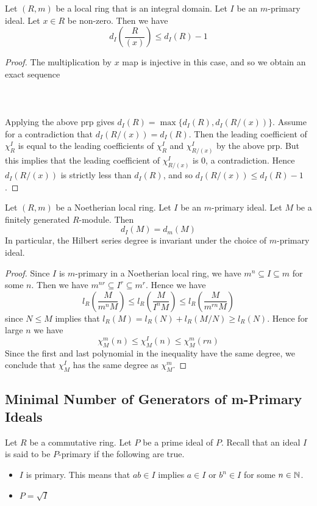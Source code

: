 \documentclass[a4paper]{article}
\begin{document}
\begin{crl}{}{} Let $(R,m)$ be a local ring that is an integral domain. Let $I$ be an $m$-primary ideal. Let $x\in R$ be non-zero. Then we have $$d_I\left(\frac{R}{(x)}\right)\leq d_I(R)-1$$ \tcbline
\begin{proof}
The multiplication by $x$ map is injective in this case, and so we obtain an exact sequence \\~\\
\\~\\
Applying the above prp gives $d_I(R)=\max\{d_I(R),d_I(R/(x))\}$. Assume for a contradiction that $d_I(R/(x))=d_I(R)$. Then the leading coefficient of $\chi_R^I$ is equal to the leading coefficients of $\chi_R^I$ and $\chi_{R/(x)}^I$ by the above prp. But this implies that the leading coefficient of $\chi_{R/(x)}^I$ is $0$, a contradiction. Hence $d_I(R/(x))$ is strictly less than $d_I(R)$, and so $d_I(R/(x))\leq d_I(R)-1$. 
\end{proof}
\end{crl}

\begin{prp}{}{} Let $(R,m)$ be a Noetherian local ring. Let $I$ be an $m$-primary ideal. Let $M$ be a finitely generated $R$-module. Then $$d_I(M)=d_m(M)$$ In particular, the Hilbert series degree is invariant under the choice of $m$-primary ideal. \tcbline
\begin{proof}
Since $I$ is $m$-primary in a Noetherian local ring, we have $m^n\subseteq I\subseteq m$ for some $n$. Then we have $m^{nr}\subseteq I^r\subseteq m^r$. Hence we have $$l_R\left(\frac{M}{m^nM}\right)\leq l_R\left(\frac{M}{I^nM}\right)\leq l_R\left(\frac{M}{m^{rn}M}\right)$$ since $N\leq M$ implies that $l_R(M)=l_R(N)+l_R(M/N)\geq l_R(N)$. Hence for large $n$ we have $$\chi_M^m(n)\leq\chi_M^I(n)\leq\chi_M^m(rn)$$ Since the first and last polynomial in the inequality have the same degree, we conclude that $\chi_M^I$ has the same degree as $\chi_M^m$. 
\end{proof}
\end{prp}

\subsection{Minimal Number of Generators of m-Primary Ideals}
Let $R$ be a commutative ring. Let $P$ be a prime ideal of $P$. Recall that an ideal $I$ is said to be $P$-primary if the following are true. 
\begin{itemize}
\item $I$ is primary. This means that $ab\in I$ implies $a\in I$ or $b^n\in I$ for some $n\in\mathbb{N}$. 
\item $P=\sqrt{I}$
\end{itemize}
\end{document}
